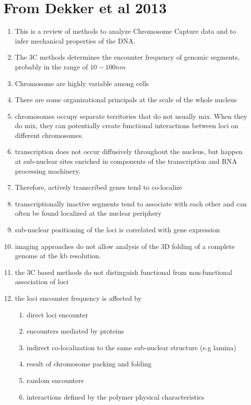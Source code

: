\documentclass[12pt]{book}
\begin{document}
\section{From Dekker et al 2013 \cite{dekker2013exploring}}
\begin{enumerate}
 \itemsep1pt  \parskip1pt 
\item This is a review of methods to analyze Chromosome Capture data and to infer mechanical properties of the DNA.
\item The 3C methods determines the encounter frequency of genomic segments, probably in the range of $10-100nm$
\item Chromosome are highly variable among cells \cite{muller2010stable}
\item There are some organizational principals at the scale of the whole nucleus
\item chromosomes occupy separate territories that do not usually mix\cite{marshall1997interphase}. When they do mix, they can potentially create functional interactions between loci on different chromosomes. 
\item transcription does not occur diffusively throughout the nucleus, but happen at sub-nuclear sites enriched in components of the transcription and RNA processing machinery.
\item Therefore, actively transcribed genes tend to co-localize
\item transcriptionally inactive segments tend to associate with each other and can often be found localized at the nuclear periphery
\item sub-nuclear positioning of the loci is correlated with gene expression
\item imaging approaches do not allow analysis of the 3D folding of a complete genome at the kb resolution. 
\item the 3C based methods do not distinguish functional from non-functional association of loci
\item the loci encounter frequency is affected by \begin{enumerate}
\item direct loci encounter
\item encounters mediated by proteins
\item indirect co-localization to the same sub-nuclear structure (e.g lamina)
\item result of chromosome packing and folding 
\item random encounters
\item interactions defined by the polymer physical characteristics

\end{enumerate}
\end{enumerate}
\end{document}
